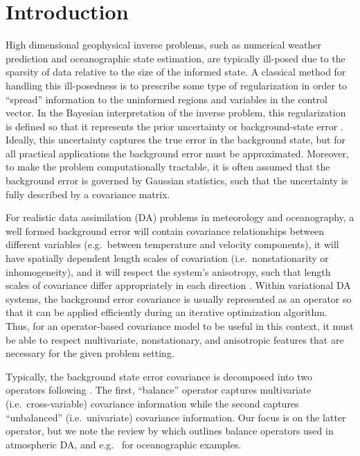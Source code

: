 \section{Introduction}
\label{sec:intro}

High dimensional geophysical inverse problems,
such as numerical weather prediction and
oceanographic state estimation, are typically ill-posed due to the
sparsity of data relative to the size of the informed state.
A classical method for handling this ill-posedness is to prescribe
some type of regularization in order to ``spread'' information to the uninformed
regions and variables in the control vector.
In the Bayesian interpretation of the inverse problem, this regularization
is defined so that it represents the prior uncertainty or background-state error
\citep[e.g.][]{bui-thanh_computational_2013}.
Ideally, this uncertainty captures the true error in the background state, but
for all practical applications the background error must be
approximated.
Moreover, to make the problem computationally tractable, it is often assumed
that the background error is governed by Gaussian statistics, such that the
uncertainty is fully described by a covariance matrix.

For realistic data assimilation (DA) problems in meteorology and
oceanography, a well formed background error will contain covariance relationships between
different variables (e.g.\ between temperature and velocity components),
it will have spatially dependent length scales of covariation
(i.e.\ nonstationarity or inhomogeneity),
and it will respect the system's anisotropy, such that length scales of covariance differ
appropriately in each direction \citep[e.g.][]{bannister_review_2008-1}.
Within variational DA systems, the background error covariance is
usually represented as an operator so that it can be applied efficiently during
an iterative optimization algorithm.
Thus, for an operator-based covariance model to be useful in this context, it must be
able to respect multivariate, nonstationary, and anisotropic features that are
necessary for the given problem setting.

Typically, the background state error covariance is decomposed into two
operators following \citet{derber_reformulation_1999}.
The first, ``balance'' operator captures multivariate (i.e.\ cross-variable)
covariance information while the second captures ``unbalanced'' (i.e.\
univariate) covariance information.
Our focus is on the latter operator, but we note the review by
\citet{bannister_review_2008-2} which outlines balance operators used in
atmospheric DA, and e.g.\ \citet{weaver_multivariate_2005,moore_regional_2011-1} for oceanographic
examples.

